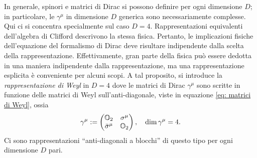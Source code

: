 In generale, spinori e matrici di Dirac si possono definire per ogni dimensione $D$; in particolare, le $\gamma^\mu$ in dimensione $D$ generica sono necessariamente complesse. Qui ci si concentra specialmente sul caso $D = 4$. Rappresentazioni equivalenti dell'algebra di Clifford descrivono la stessa fisica. Pertanto, le implicazioni fisiche dell'equazione del formalismo di Dirac deve risultare indipendente dalla scelta della rappresentazione. Effettivamente, gran parte della fisica può essere dedotta in una maniera indipendente dalla rappresentazione, ma una rappresentazione esplicita è conveniente per alcuni scopi. A tal proposito, si introduce la \emph{rappresentazione di Weyl} in $D = 4$ dove le matrici di Dirac $\gamma^\mu$ sono scritte in funzione delle matrici di Weyl sull'anti-diagonale, viste in equazione \eqref{eq: matrici di Weyl}, ossia 
\begin{equation}
\label{eq: rappresentazione di Weyl per le matrici di Dirac}
    \gamma^\mu := 
    \begin{pmatrix}
        \mathbb{O}_2 & \sigma^\mu \\
        \bar{\sigma}^\mu & \mathbb{O}_2
    \end{pmatrix},\quad \dim{\gamma^\mu} = 4.
\end{equation}
Ci sono rappresentazioni ``anti-diagonali a blocchi'' di questo tipo per ogni dimensione $D$ pari. 

